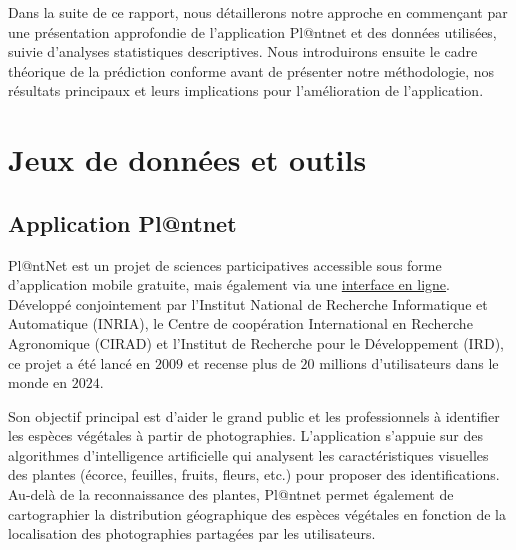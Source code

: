 \documentclass[a4paper,12pt]{article}
\begin{document}
\vspace{0.2cm}

Dans la suite de ce rapport, nous détaillerons notre approche en commençant par une présentation approfondie de l'application Pl@ntnet et des données utilisées, suivie d'analyses statistiques descriptives. Nous introduirons ensuite le cadre théorique de la prédiction conforme avant de présenter notre méthodologie, nos résultats principaux et leurs implications pour l'amélioration de l'application.


\section{Jeux de données et outils}


\subsection{Application Pl@ntnet}

Pl@ntNet est un projet de sciences participatives accessible sous forme d’application mobile gratuite, mais également via une \href{https://identify.plantnet.org/fr}{interface en ligne}. Développé conjointement par l'Institut National de Recherche Informatique et Automatique (INRIA), le Centre de coopération International en Recherche Agronomique (CIRAD) et l'Institut de Recherche pour le Développement (IRD), ce projet a été lancé en $2009$ et recense plus de $20$ millions d'utilisateurs dans le monde en $2024$. 

\vspace{0.2cm}

Son objectif principal est d'aider le grand public et les professionnels à identifier les espèces végétales à partir de photographies. L'application s'appuie sur des algorithmes d'intelligence artificielle qui analysent les caractéristiques visuelles des plantes (écorce, feuilles, fruits, fleurs, etc.) pour proposer des identifications. Au-delà de la reconnaissance des plantes, Pl@ntnet permet également de cartographier la distribution géographique des espèces végétales en fonction de la localisation des photographies partagées par les utilisateurs.

\vspace{0.2cm}
\end{document}
